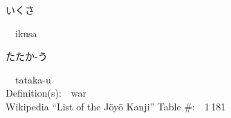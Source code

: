 \begin{multicols}{2}
{\hspace*{2em}}{\begin{CJK}{UTF8}{min} いくさ \end{CJK}}\ \ ikusa\ \ \\
{\hspace*{2em}}{\begin{CJK}{UTF8}{min} たたか-う \end{CJK}}\ \ tataka-u\ \ \\
Definition(s):\ \ war \\
Wikipedia ``List of the J\=oy\=o Kanji'' Table \#:\ \ 1\,181 \\
\ \ \\
\end{multicols}



